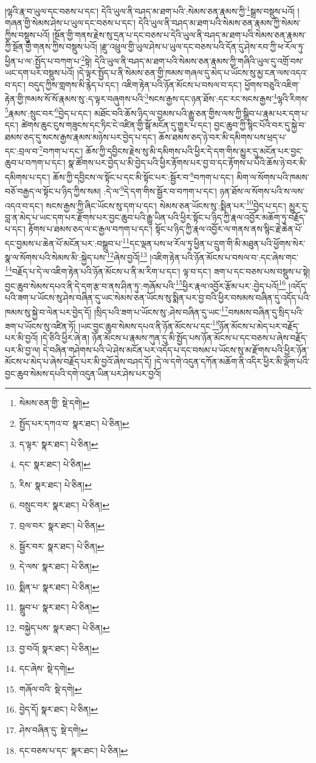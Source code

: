 །ལྷའི་རྣ་བ་ཡུལ་དང་བཅས་པ་དང་། དེའི་ཡུལ་ནི་བཤད་མ་ཐག་པའི་:སེམས་ཅན་རྣམས་ཀྱི་\footnote{སེམས་ཅན་གྱི་  སྡེ་དགེ། }སྒྲས་བསྡུས་པའོ། །གཞན་གྱི་སེམས་ཤེས་པ་ཡུལ་དང་བཅས་པ་དང་། དེའི་ཡུལ་ནི་བཤད་མ་ཐག་པའི་སེམས་ཅན་རྣམས་ཀྱི་སེམས་ཀྱིས་བསྡུས་པའོ། །སྔོན་གྱི་གནས་རྗེས་སུ་དྲན་པ་དང་བཅས་པ་དེའི་ཡུལ་ནི་བཤད་མ་ཐག་པའི་སེམས་ཅན་རྣམས་ཀྱི་སྔོན་གྱི་གནས་ཀྱིས་བསྡུས་པའོ། །རྫུ་འཕྲུལ་གྱི་ཡུལ་ཤེས་པ་ཡུལ་དང་བཅས་པའི་དོན་དུ་ཤེས་རབ་ཀྱི་ཕ་རོལ་ཏུ་ཕྱིན་པ་ལ་:སྤྱོད་པ་བཀག་པ་\footnote{སྤྱོད་པར་དཀའ་བ་  སྣར་ཐང་།  པེ་ཅིན། }སྟེ། དེའི་ཡུལ་ནི་བཤད་མ་ཐག་པའི་སེམས་ཅན་རྣམས་ཀྱི་གཞིའི་ཡུལ་དུ་འགྲོ་བས་ཡང་དག་པར་བསྡུས་པའོ། །དེ་ལྟར་སྤྱོད་པ་ནི་སེམས་ཅན་གྱི་ཁམས་གཞལ་དུ་མེད་པ་ཡོངས་སུ་མྱ་ངན་ལས་འདའ་བ་དང་། བདུད་ཀྱིས་གླགས་མི་རྙེད་པ་དང་། འཇིག་རྟེན་པའི་ཉོན་མོངས་པ་བསལ་བ་དང་། ཕྱོགས་བཅུའི་འཇིག་རྟེན་གྱི་ཁམས་སོ་སོ་རྣམས་སུ་:ད་ལྟར་བཞུགས་པའི་\footnote{ད་ལྟར་  སྣར་ཐང་།  པེ་ཅིན། }སངས་རྒྱས་དང་ཉན་ཐོས་:དང་རང་སངས་རྒྱས་\footnote{དང་  སྣར་ཐང་།  པེ་ཅིན། }ལྷའི་རིགས་\footnote{རིས་  སྣར་ཐང་།  པེ་ཅིན། }རྣམས་:སྲུང་བར་\footnote{བསྲུང་བར་  སྣར་ཐང་།  པེ་ཅིན། }བྱེད་པ་དང་། མཐོང་བའི་ཆོས་ཉིད་ལ་བྱམས་པའི་རྒྱུ་ཅན་གྱིས་ལས་ཀྱི་སྒྲིབ་པ་རྣམ་པར་དག་པ་དང་། ཚེགས་ཆུང་ངུས་གཟུངས་དང་ཏིང་ངེ་འཛིན་གྱི་སྒོ་མངོན་དུ་གྱུར་པ་དང་། བྱང་ཆུབ་ཀྱི་སྙིང་པོའི་བར་དུ་སྐྱེ་བ་ཐམས་ཅད་དུ་སངས་རྒྱས་རྣམས་མཉེས་པར་བྱེད་པ་དང་། ཆོས་ཐམས་ཅད་ཉེ་བར་མི་དམིགས་པས་ཕྲད་པ་དང་:བྲལ་བ་\footnote{བྲལ་བར་  སྣར་ཐང་།  པེ་ཅིན། }བཀག་པ་དང་། ཆོས་ཀྱི་དབྱིངས་རྗེས་སུ་མི་དམིགས་པའི་ཕྱིར་དེ་དག་གིས་མྱུར་དུ་མངོན་པར་བྱང་ཆུབ་པ་བཀག་པ་དང་། སྣ་ཚོགས་པར་བྱེད་པ་མི་བྱེད་པའི་ཕྱིར་རྟོགས་པར་བྱ་བ་དང་རྟོགས་པ་པོའི་ཆོས་ཉེ་བར་མི་དམིགས་པ་དང་། ཆོས་ཀྱི་དབྱིངས་ལ་སྟོང་པ་དང་མི་སྟོང་པར་:སྦྱོར་བ་\footnote{སྦྱོར་བར་  སྣར་ཐང་།  པེ་ཅིན། }བཀག་པ་དང་། མིག་ལ་སོགས་པའི་ཁམས་བཅོ་བརྒྱད་ལ་སྟོང་པ་ཉིད་ཀྱིས་སམ། :དེ་ལ་\footnote{དེ་ལས་  སྣར་ཐང་།  པེ་ཅིན། }དེ་དག་གིས་སྦྱོར་བ་བཀག་པ་དང་། ཉན་ཐོས་ལ་སོགས་པའི་ས་ལས་འདའ་བ་དང་། སངས་རྒྱས་ཀྱི་ཞིང་ཡོངས་སུ་དག་པ་དང་། སེམས་ཅན་ཡོངས་སུ་:སྨིན་པར་\footnote{སྨིན་པ་  སྣར་ཐང་།  པེ་ཅིན། }བྱེད་པ་དང་། མྱུར་དུ་བླ་ན་མེད་པ་ཡང་དག་པར་རྫོགས་པར་བྱང་ཆུབ་པའི་རྒྱུ་ཡིན་པའི་ཕྱིར་སྟོང་པ་ཉིད་ཀྱི་རྣལ་འབྱོར་མཆོག་ཏུ་བརྗོད་པ་དང་། རྟོགས་པ་ཐམས་ཅད་ལ་ང་རྒྱལ་བཀག་པ་དང་། སྟོང་པ་ཉིད་ཀྱི་རྣལ་འབྱོར་ལ་གནས་ནས་སྙིང་རྗེ་ཆེན་པོ་དང་བྱམས་པ་ཆེན་པོ་མངོན་པར་:བསྒྲུབ་པ་\footnote{སྒྲུབ་པ་  སྣར་ཐང་།  པེ་ཅིན། }དང་ལྡན་པས་ཕ་རོལ་ཏུ་ཕྱིན་པ་དྲུག་གི་མི་མཐུན་པའི་ཕྱོགས་སེར་སྣ་ལ་སོགས་པའི་སེམས་མི་:སྐྱེད་པས་\footnote{བསྐྱེད་པས་  སྣར་ཐང་།  པེ་ཅིན། }ཞེས་བྱའོ།\footnote{བྱ་བའོ།  སྣར་ཐང་།  པེ་ཅིན། } །འཇིག་རྟེན་པའི་ཉོན་མོངས་པ་བསལ་བ་:དང་ཞེས་གང་\footnote{དང་ཞེས་  སྡེ་དགེ། }བརྗོད་པ་དེ་ལ་འཇིག་རྟེན་པའི་ཉོན་མོངས་པ་ནི་མ་རིག་པ་དང་། ལྟ་བ་དང་། ཟག་པ་དང་བཅས་པས་བསྡུས་པ་སྟེ། བྱང་ཆུབ་སེམས་དཔའ་ནི་དེ་དག་རྩ་བ་ནས་ཤིན་ཏུ་:གཞོམ་པའི་\footnote{གཞོལ་བའི་  སྡེ་དགེ། }ཕྱིར་རྣལ་འབྱོར་རྩོམ་པར་:བྱེད་པའོ།\footnote{བྱེད་དོ།  སྣར་ཐང་།  པེ་ཅིན། } །འདོད་པའི་ཟག་པ་ཡོངས་སུ་ཤེས་བཞིན་དུ་ཡང་སེམས་ཅན་ཡོངས་སུ་སྨིན་པར་བྱ་བའི་ཕྱིར་བསམས་བཞིན་དུ་འདོད་པའི་ཁམས་སུ་སྐྱེ་བ་ལེན་པར་བྱེད་དོ། །སྲིད་པའི་ཟག་པ་ཡོངས་སུ་:ཤེས་བཞིན་དུ་ཡང་\footnote{ཤེས་བཞིན་དུ་  སྡེ་དགེ། }བསམས་བཞིན་དུ་སྲིད་པའི་ཟག་པ་ཡོངས་སུ་འཛིན་ཏོ། །ཡང་བྱང་ཆུབ་སེམས་དཔའ་ནི་ཉོན་མོངས་པ་དང་\footnote{དང་བཅས་པ་དང་  སྣར་ཐང་།  པེ་ཅིན། }ཉོན་མོངས་པ་མེད་པར་བརྗོད་པར་མི་བྱའོ། །དེ་ཅིའི་ཕྱིར་ཞེ་ན། ཉོན་མོངས་པ་རྣམས་ཀུན་དུ་མི་སྤྱོད་པས་ཉོན་མོངས་པ་དང་བཅས་པ་ཞེས་བརྗོད་པར་མི་བྱ་ལ། དེ་བཞིན་གཤེགས་པའི་ཡེ་ཤེས་མངོན་པར་འདོད་པ་དང་བསམ་པ་ཡོངས་སུ་མ་རྫོགས་པའི་ཕྱིར་ཉོན་མོངས་པ་མེད་པ་ཞེས་བརྗོད་པར་མི་བྱའོ་ཞེས་བཤད་དོ། །དེ་ལ་དགེ་འདུན་དཀོན་མཆོག་ནི་འདིར་ཕྱིར་མི་ལྡོག་པའི་བྱང་ཆུབ་སེམས་དཔའི་དགེ་འདུན་ཡིན་པར་ཤེས་པར་བྱའོ། 